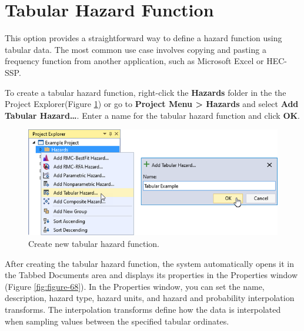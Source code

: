 \documentclass[
]{book}
\begin{document}
\hypertarget{tabular-hazard-function}{%
\section{Tabular Hazard Function}\label{tabular-hazard-function}}

This option provides a straightforward way to define a hazard function using tabular data. The most common use case involves copying and pasting a frequency function from another application, such as Microsoft Excel or HEC-SSP.

To create a tabular hazard function, right-click the \textbf{Hazards} folder in the the Project Explorer(Figure \ref{fig:figure-67}) or go to \textbf{Project Menu \textgreater{} Hazards} and select \textbf{Add Tabular Hazard\ldots{}}. Enter a name for the tabular hazard function and click \textbf{OK}.

\begin{figure}

{\centering \includegraphics{images/figure67} 

}

\caption{Create new tabular hazard function.}\label{fig:figure-67}
\end{figure}

After creating the tabular hazard function, the system automatically opens it in the Tabbed Documents area and displays its properties in the Properties window (Figure \ref{fig:figure-68}). In the Properties window, you can set the name, description, hazard type, hazard units, and hazard and probability interpolation transforms. The interpolation transforms define how the data is interpolated when sampling values between the specified tabular ordinates.
\end{document}
